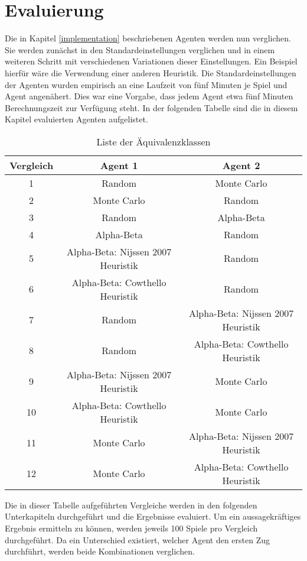 \chapter{Evaluierung}
Die in Kapitel \ref{implementation} beschriebenen Agenten werden nun verglichen. Sie werden zunächst in den Standardeinstellungen verglichen und in einem weiteren Schritt mit verschiedenen Variationen dieser Einstellungen. Ein Beispiel hierfür wäre die Verwendung einer anderen Heuristik. Die Standardeinstellungen der Agenten wurden empirisch an eine Laufzeit von fünf Minuten je Spiel und Agent angenähert. Dies war eine Vorgabe, dass jedem Agent etwa fünf Minuten Berechnungszeit zur Verfügung steht.
In der folgenden Tabelle sind die in diesem Kapitel evaluierten Agenten aufgelistet.
\begin{table}[ht]
\begin{center}
\begin{tabular}{| c | c | c |} \hline
Vergleich & Agent 1 & Agent 2 \\ \hline
1 & Random & Monte Carlo  \\ \hline
2 & Monte Carlo & Random\\ \hline
3 & Random & Alpha-Beta\\ \hline
4 & Alpha-Beta & Random\\ \hline
5 & Alpha-Beta: Nijssen 2007 Heuristik & Random\\ \hline
6 & Alpha-Beta: Cowthello Heuristik & Random\\ \hline
7 & Random & Alpha-Beta: Nijssen 2007 Heuristik \\ \hline
8 & Random & Alpha-Beta: Cowthello Heuristik \\ \hline
9 & Alpha-Beta: Nijssen 2007 Heuristik & Monte Carlo\\ \hline
10 & Alpha-Beta: Cowthello Heuristik & Monte Carlo\\ \hline
11 & Monte Carlo & Alpha-Beta: Nijssen 2007 Heuristik \\ \hline
12 & Monte Carlo & Alpha-Beta: Cowthello Heuristik \\ \hline
\end{tabular}
\end{center}
\caption{Liste der Äquivalenzklassen}
\label{agents1}
\end{table}

Die in dieser Tabelle aufgeführten Vergleiche werden in den folgenden Unterkapiteln durchgeführt und die Ergebnisse evaluiert.
Um ein aussagekräftiges Ergebnis ermitteln zu können, werden jeweils 100 Spiele pro Vergleich durchgeführt. Da ein Unterschied existiert, welcher Agent den ersten Zug durchführt, werden beide Kombinationen verglichen.
